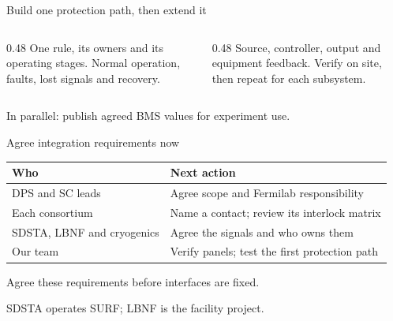 \documentclass[aspectratio=169,11pt]{beamer}
\begin{document}
\begin{frame}{Build one protection path, then extend it}
  \begin{columns}[T,onlytextwidth]
    \begin{column}{0.48\textwidth}
        {One rule, its owners and its operating stages.}
      \bigskip
        {Normal operation, faults, lost signals and recovery.}
    \end{column}
    \begin{column}{0.48\textwidth}
        {Source, controller, output and equipment feedback.}
      \bigskip
        {Verify on site, then repeat for each subsystem.}
    \end{column}
  \end{columns}
  \bigskip
  In parallel: publish agreed BMS values for experiment use.
\end{frame}

\begin{frame}{Agree integration requirements now}
  \renewcommand{\arraystretch}{1.5}
  \begin{tabularx}{\textwidth}{@{}l>{\RaggedRight\arraybackslash}X@{}}
    \textbf{Who} & \textbf{Next action}\\
    \midrule
    DPS and SC leads & Agree scope and Fermilab responsibility\\
    Each consortium & Name a contact; review its interlock matrix\\
    SDSTA, LBNF and cryogenics & Agree the signals and who owns them\\
    Our team & Verify panels; test the first protection path\\
  \end{tabularx}\par
  \bigskip
  \large Agree these requirements before interfaces are fixed.\par
  \medskip
  {\footnotesize\color{DuneTextMuted}SDSTA operates SURF; LBNF is the facility project.}
\end{frame}
\end{document}
